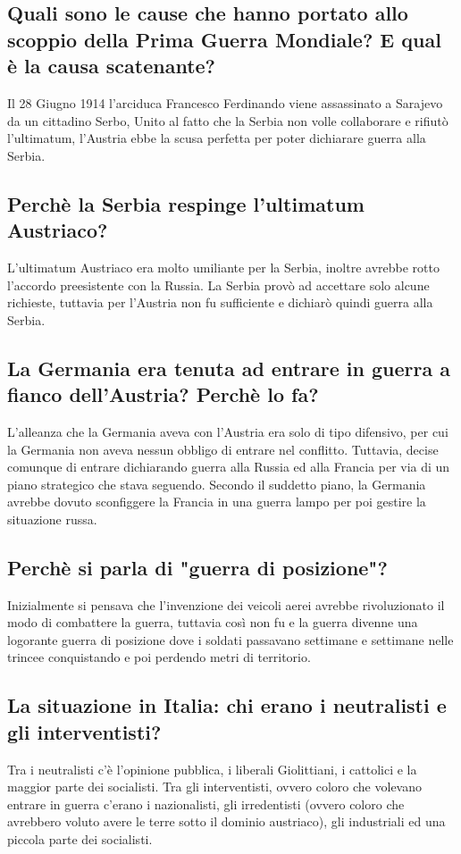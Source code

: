 \documentclass{article}
\begin{document}
\subsection{Quali sono le cause che hanno portato allo scoppio della Prima Guerra Mondiale? E qual è la causa scatenante?}
Il 28 Giugno 1914 l'arciduca Francesco Ferdinando viene assassinato a Sarajevo da un cittadino Serbo, Unito al fatto che
la Serbia non volle collaborare e rifiutò l'ultimatum, l'Austria ebbe la scusa perfetta per poter dichiarare guerra
alla Serbia.

\subsection{Perchè la Serbia respinge l'ultimatum Austriaco?}
L'ultimatum Austriaco era molto umiliante per la Serbia, inoltre avrebbe rotto l'accordo preesistente con la Russia.
La Serbia provò ad accettare solo alcune richieste, tuttavia per l'Austria non fu sufficiente e dichiarò quindi guerra
alla Serbia.

\subsection{La Germania era tenuta ad entrare in guerra a fianco dell'Austria? Perchè lo fa?}
L'alleanza che la Germania aveva con l'Austria era solo di tipo difensivo, per cui la Germania non aveva nessun obbligo
di entrare nel conflitto. Tuttavia, decise comunque di entrare dichiarando guerra alla Russia ed alla Francia per via
di un piano strategico che stava seguendo. Secondo il suddetto piano, la Germania avrebbe dovuto sconfiggere la Francia
in una guerra lampo per poi gestire la situazione russa.

\subsection{Perchè si parla di "guerra di posizione"?}
Inizialmente si pensava che l'invenzione dei veicoli aerei avrebbe rivoluzionato il modo di combattere la guerra,
tuttavia così non fu e la guerra divenne una logorante guerra di posizione dove i soldati passavano settimane
e settimane nelle trincee conquistando e poi perdendo metri di territorio.

\subsection{La situazione in Italia: chi erano i neutralisti e gli interventisti?}
Tra i neutralisti c'è l'opinione pubblica, i liberali Giolittiani, i cattolici e la maggior parte dei socialisti. Tra gli
interventisti, ovvero coloro che volevano entrare in guerra c'erano i nazionalisti, gli irredentisti (ovvero coloro che
avrebbero voluto avere le terre sotto il dominio austriaco), gli industriali ed una piccola parte dei socialisti.
\end{document}
